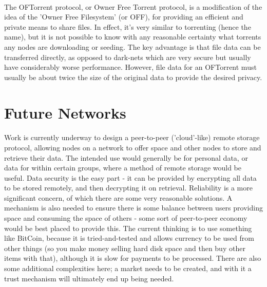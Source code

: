 \documentclass{article}
\begin{document}
\paragraph{}
The OFTorrent protocol, or Owner Free Torrent protocol, is a modification of the idea of the 'Owner Free Filesystem' (or OFF), for providing an efficient and private means to share files. In effect, it's very similar to torrenting (hence the name), but it is not possible to know with any reasonable certainty what torrents any nodes are downloading or seeding. The key advantage is that file data can be transferred directly, as opposed to dark-nets which are very secure but usually have considerably worse performance. However, file data for an OFTorrent must usually be about twice the size of the original data to provide the desired privacy.

\section{Future Networks}

\paragraph{}
Work is currently underway to design a peer-to-peer ('cloud'-like) remote storage protocol, allowing nodes on a network to offer space and other nodes to store and retrieve their data. The intended use would generally be for personal data, or data for within certain groups, where a method of remote storage would be useful. Data security is the easy part - it can be provided by encrypting all data to be stored remotely, and then decrypting it on retrieval. Reliability is a more significant concern, of which there are some very reasonable solutions. A mechanism is also needed to ensure there is some balance between users providing space and consuming the space of others - some sort of peer-to-peer economy would be best placed to provide this. The current thinking is to use something like BitCoin, because it is tried-and-tested and allows currency to be used from other things (so you make money selling hard disk space and then buy other items with that), although it is slow for payments to be processed. There are also some additional complexities here; a market needs to be created, and with it a trust mechanism will ultimately end up being needed.
\end{document}
